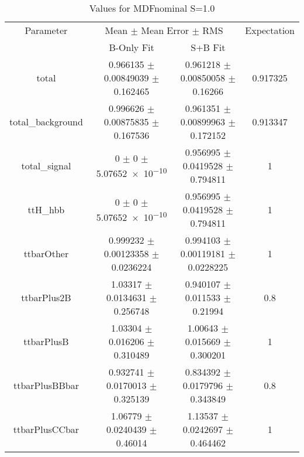 \begin{table}
\centering
\caption{Values for MDFnominal S=1.0}
\begin{tabular}{cccc}
\toprule
Parameter & \multicolumn{2}{c}{Mean $\pm$ Mean Error $\pm$ RMS} & Expectation\\
 & B-Only Fit & S+B Fit & \\
\midrule
total & \num{0.966135} $\pm$ \num{0.00849039} $\pm$ \num{0.162465} & \num{0.961218} $\pm$ \num{0.00850058} $\pm$ \num{0.16266} & \num{0.917325}\\
total\_background & \num{0.996626} $\pm$ \num{0.00875835} $\pm$ \num{0.167536} & \num{0.961351} $\pm$ \num{0.00899963} $\pm$ \num{0.172152} & \num{0.913347}\\
total\_signal & \num{0} $\pm$ \num{0} $\pm$ \num{5.07652e-10} & \num{0.956995} $\pm$ \num{0.0419528} $\pm$ \num{0.794811} & \num{1}\\
ttH\_hbb & \num{0} $\pm$ \num{0} $\pm$ \num{5.07652e-10} & \num{0.956995} $\pm$ \num{0.0419528} $\pm$ \num{0.794811} & \num{1}\\
ttbarOther & \num{0.999232} $\pm$ \num{0.00123358} $\pm$ \num{0.0236224} & \num{0.994103} $\pm$ \num{0.00119181} $\pm$ \num{0.0228225} & \num{1}\\
ttbarPlus2B & \num{1.03317} $\pm$ \num{0.0134631} $\pm$ \num{0.256748} & \num{0.940107} $\pm$ \num{0.011533} $\pm$ \num{0.21994} & \num{0.8}\\
ttbarPlusB & \num{1.03304} $\pm$ \num{0.016206} $\pm$ \num{0.310489} & \num{1.00643} $\pm$ \num{0.015669} $\pm$ \num{0.300201} & \num{1}\\
ttbarPlusBBbar & \num{0.932741} $\pm$ \num{0.0170013} $\pm$ \num{0.325139} & \num{0.834392} $\pm$ \num{0.0179796} $\pm$ \num{0.343849} & \num{0.8}\\
ttbarPlusCCbar & \num{1.06779} $\pm$ \num{0.0240439} $\pm$ \num{0.46014} & \num{1.13537} $\pm$ \num{0.0242697} $\pm$ \num{0.464462} & \num{1}\\
\bottomrule
\end{tabular}
\end{table}